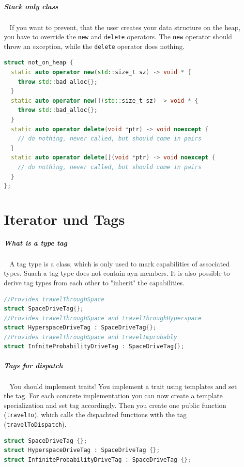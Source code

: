 \documentclass[11pt,twoside,landscape]{article}
\begin{document}
\begin{multicols}{2}
\subparagraph{Stack only class} \
\label{sec:org2384bc6}
If you want to prevent, that the user creates your data structure on the heap, you have to override the \texttt{new} and \texttt{delete} operators.
The \texttt{new} operator should throw an exception, while the \texttt{delete} operator does nothing.

\begin{lstlisting}[language=c++,label=lst:example-struct-with-overriden-operators,caption={Example struct with overriden operators},captionpos=b,numbers=none]
struct not_on_heap {
  static auto operator new(std::size_t sz) -> void * {
    throw std::bad_alloc{};
  }
  static auto operator new[](std::size_t sz) -> void * {
    throw std::bad_alloc{};
  }
  static auto operator delete(void *ptr) -> void noexcept {
    // do nothing, never called, but should come in pairs
  }
  static auto operator delete[](void *ptr) -> void noexcept {
    // do nothing, never called, but should come in pairs
  }
};
\end{lstlisting}

\section{Iterator und Tags}
\label{sec:orgbbd56b9}
\subparagraph{What is a type tag} \
\label{sec:org0fb6f50}
A tag type is a class, which is only used to mark capabilities of associated types.
Suach a tag type does not contain ayn members.
It is also possible to derive tag types from each other to "inherit" the capabilities.


\begin{lstlisting}[language=c++,numbers=none]
//Provides travelThroughSpace
struct SpaceDriveTag{};
//Provides travelThroughSpace and travelThroughHyperspace
struct HyperspaceDriveTag : SpaceDriveTag{};
//Provides travelThroughSpace and travelImprobably
struct InfniteProbabilityDriveTag : SpaceDriveTag{};
\end{lstlisting}

\subparagraph{Tags for dispatch} \
\label{sec:org7d48eb8}
You should implement traits!
You implement a trait using templates and set the tag.
For each concrete implementation you can now create a template specialization and set tag accordingly.
Then you create one public function (\texttt{travelTo}), which calls the dispachted functions with the tag (\texttt{travelToDispatch}).

\begin{lstlisting}[language=c++,label=lst:tag-for-dispatching-example,caption={Tag for dispatching example},captionpos=b,numbers=none]
struct SpaceDriveTag {};
struct HyperspaceDriveTag : SpaceDriveTag {};
struct InfiniteProbabilityDriveTag : SpaceDriveTag {};


\end{lstlisting}
\end{multicols}
\end{document}
